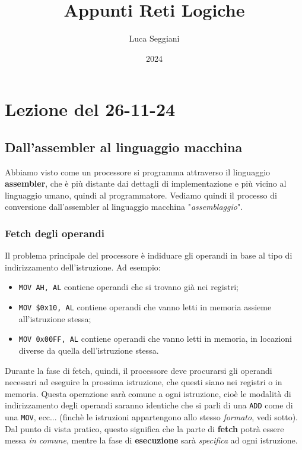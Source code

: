 \documentclass[a4paper,11pt]{article}
\title{Appunti Reti Logiche}
\author{Luca Seggiani}
\date{2024}
\begin{document}
\section{Lezione del 26-11-24}

\thispagestyle{empty}
\pagestyle{fancy}

\subsection{Dall'assembler al linguaggio macchina}
Abbiamo visto come un processore si programma attraverso il linguaggio \textbf{assembler}, che è più distante dai dettagli di implementazione e più vicino al linguaggio umano, quindi al programmatore.
Vediamo quindi il processo di conversione dall'assembler al linguaggio macchina "\textit{assemblaggio}".

\subsubsection{Fetch degli operandi}
Il problema principale del processore è indiduare gli operandi in base al tipo di indirizzamento dell'istruzione.
Ad esempio:
\begin{itemize}
	\item \lstinline|MOV AH, AL| contiene operandi che si trovano già nei registri;
	\item \lstinline|MOV $0x10, AL| contiene operandi che vanno letti in memoria assieme all'istruzione stessa;
	\item \lstinline|MOV 0x00FF, AL| contiene operandi che vanno letti in memoria, in locazioni diverse da quella dell'istruzione stessa.
\end{itemize}

Durante la fase di fetch, quindi, il processore deve procurarsi gli operandi necessari ad eseguire la prossima istruzione, che questi siano nei registri o in memoria.
Questa operazione sarà comune a ogni istruzione, cioè le modalità di indirizzamento degli operandi saranno identiche che si parli di una \lstinline|ADD| come di una \lstinline|MOV|, ecc... (finchè le istruzioni appartengono allo stesso \textit{formato}, vedi sotto).
Dal punto di vista pratico, questo significa che la parte di \textbf{fetch} potrà essere messa \textit{in comune}, mentre la fase di \textbf{esecuzione} sarà \textit{specifica} ad ogni istruzione.
\end{document}
